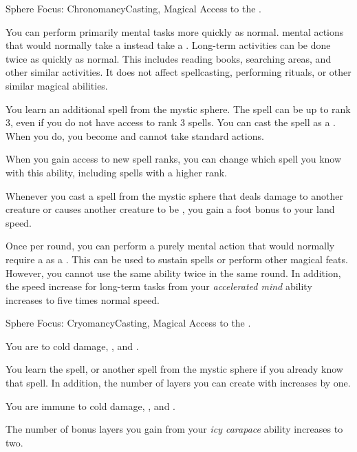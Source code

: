     \begin{magicalfeat}{Sphere Focus: Chronomancy}{Casting, Magical}
        \featpre Access to the  .

         You can perform primarily mental tasks more quickly as normal.
         mental actions that would normally take a  instead take a .
        Long-term activities can be done twice as quickly as normal.
        This includes reading books, searching areas, and other similar activities.
        It does not affect spellcasting, performing rituals, or other similar magical abilities.

         You learn an additional spell from the  mystic sphere.
        The spell can be up to rank 3, even if you do not have access to rank 3 spells.
        You can cast the spell as a .
        When you do, you  become \slowed and cannot take standard actions.

        When you gain access to new spell ranks, you can change which spell you know with this ability, including spells with a higher rank.

         Whenever you cast a spell from the  mystic sphere that deals damage to another creature or causes another creature to be \slowed, you  gain a  foot bonus to your land speed.

         Once per round, you can perform a purely mental action that would normally require a  as a .
        This can be used to sustain spells or perform other magical feats.
        However, you cannot use the same ability twice in the same round.
        In addition, the speed increase for long-term tasks from your \textit{accelerated mind} ability increases to five times normal speed.
    \end{magicalfeat}

    \begin{magicalfeat}{Sphere Focus: Cryomancy}{Casting, Magical}
        \featpre Access to the  .

         You are  to cold damage, , and .

         You learn the  spell, or another spell from the  mystic sphere if you already know that spell.
        In addition, the number of layers you can create with  increases by one.

         You are immune to cold damage, , and .

         The number of bonus layers you gain from your \textit{icy carapace} ability increases to two.
    \end{magicalfeat}

